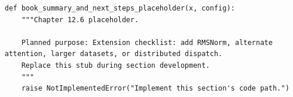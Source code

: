 \begin{lstlisting}[style=bookpython,caption={Planned code placeholder for book summary and next steps.},label={lst:ch12-book-summary-and-next-steps}]
def book_summary_and_next_steps_placeholder(x, config):
    """Chapter 12.6 placeholder.

    Planned purpose: Extension checklist: add RMSNorm, alternate attention, larger datasets, or distributed dispatch.
    Replace this stub during section development.
    """
    raise NotImplementedError("Implement this section's code path.")
\end{lstlisting}
